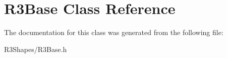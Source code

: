 \hypertarget{class_r3_base}{}\section{R3\+Base Class Reference}
\label{class_r3_base}


The documentation for this class was generated from the following file\+:\begin{DoxyCompactItemize}
\item 
R3\+Shapes/R3\+Base.\+h\end{DoxyCompactItemize}
